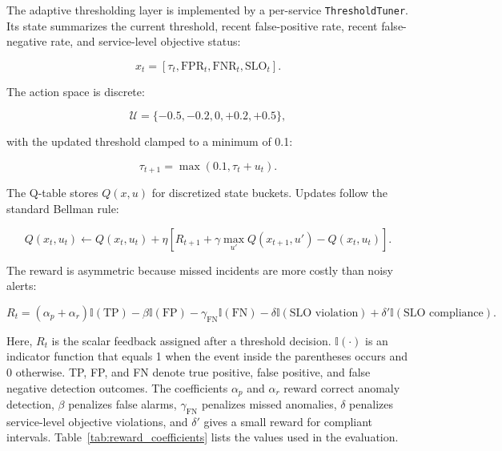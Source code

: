 The adaptive thresholding layer is implemented by a per-service
\texttt{ThresholdTuner}. Its state summarizes the current threshold, recent
false-positive rate, recent false-negative rate, and service-level objective
status:

\begin{equation}
    x_t =
    [\tau_t,\text{FPR}_t,\text{FNR}_t,\text{SLO}_t].
    \label{eq:threshold_state}
\end{equation}

The action space is discrete:

\begin{equation}
    \mathcal{U} = \{-0.5,-0.2,0,+0.2,+0.5\},
    \label{eq:threshold_actions}
\end{equation}

with the updated threshold clamped to a minimum of 0.1:

\begin{equation}
    \tau_{t+1} = \max(0.1,\tau_t + u_t).
    \label{eq:threshold_update}
\end{equation}

The Q-table stores $Q(x,u)$ for discretized state buckets. Updates follow the
standard Bellman rule:

\begin{equation}
    Q(x_t,u_t) \leftarrow Q(x_t,u_t) +
    \eta
    \left[
    R_{t+1} + \gamma \max_{u'} Q(x_{t+1},u') - Q(x_t,u_t)
    \right].
    \label{eq:threshold_bellman}
\end{equation}

The reward is asymmetric because missed incidents are more costly than noisy
alerts:

\begin{equation}
    R_t =
    (\alpha_p+\alpha_r)\mathbb{I}(\text{TP})
    - \beta\mathbb{I}(\text{FP})
    - \gamma_{\text{FN}}\mathbb{I}(\text{FN})
    - \delta\mathbb{I}(\text{SLO violation})
    + \delta'\mathbb{I}(\text{SLO compliance}).
    \label{eq:threshold_reward}
\end{equation}

Here, $R_t$ is the scalar feedback assigned after a threshold decision.
$\mathbb{I}(\cdot)$ is an indicator function that equals 1 when the event inside
the parentheses occurs and 0 otherwise. TP, FP, and FN denote true positive,
false positive, and false negative detection outcomes. The coefficients
$\alpha_p$ and $\alpha_r$ reward correct anomaly detection, $\beta$ penalizes
false alarms, $\gamma_{\text{FN}}$ penalizes missed anomalies, $\delta$
penalizes service-level objective violations, and $\delta'$ gives a small
reward for compliant intervals. Table~\ref{tab:reward_coefficients} lists the
values used in the evaluation.

